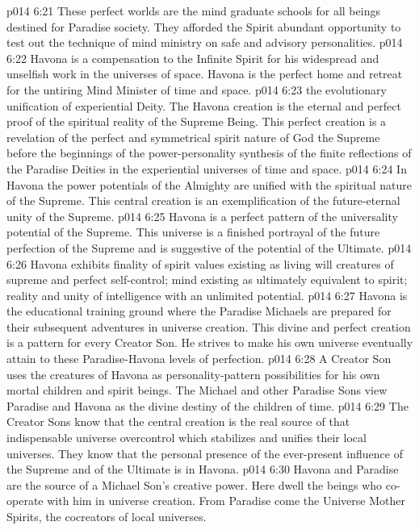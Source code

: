 \vs p014 6:21 These perfect worlds are the mind graduate schools for all beings destined for Paradise society. They afforded the Spirit abundant opportunity to test out the technique of mind ministry on safe and advisory personalities.
\vs p014 6:22 Havona is a compensation to the Infinite Spirit for his widespread and unselfish work in the universes of space. Havona is the perfect home and retreat for the untiring Mind Minister of time and space.
\vs p014 6:23 \bibnobreakspace {} the evolutionary unification of experiential Deity. The Havona creation is the eternal and perfect proof of the spiritual reality of the Supreme Being. This perfect creation is a revelation of the perfect and symmetrical spirit nature of God the Supreme before the beginnings of the power\hyp{}personality synthesis of the finite reflections of the Paradise Deities in the experiential universes of time and space.
\vs p014 6:24 In Havona the power potentials of the Almighty are unified with the spiritual nature of the Supreme. This central creation is an exemplification of the future\hyp{}eternal unity of the Supreme.
\vs p014 6:25 Havona is a perfect pattern of the universality potential of the Supreme. This universe is a finished portrayal of the future perfection of the Supreme and is suggestive of the potential of the Ultimate.
\vs p014 6:26 Havona exhibits finality of spirit values existing as living will creatures of supreme and perfect self\hyp{}control; mind existing as ultimately equivalent to spirit; reality and unity of intelligence with an unlimited potential.
\vs p014 6:27 \bibnobreakspace {} Havona is the educational training ground where the Paradise Michaels are prepared for their subsequent adventures in universe creation. This divine and perfect creation is a pattern for every Creator Son. He strives to make his own universe eventually attain to these Paradise\hyp{}Havona levels of perfection.
\vs p014 6:28 A Creator Son uses the creatures of Havona as personality\hyp{}pattern possibilities for his own mortal children and spirit beings. The Michael and other Paradise Sons view Paradise and Havona as the divine destiny of the children of time.
\vs p014 6:29 The Creator Sons know that the central creation is the real source of that indispensable universe overcontrol which stabilizes and unifies their local universes. They know that the personal presence of the ever\hyp{}present influence of the Supreme and of the Ultimate is in Havona.
\vs p014 6:30 Havona and Paradise are the source of a Michael Son’s creative power. Here dwell the beings who co\hyp{}operate with him in universe creation. From Paradise come the Universe Mother Spirits, the cocreators of local universes.
